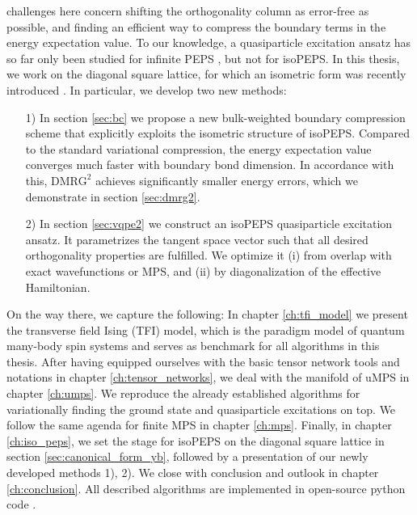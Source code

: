 challenges here concern shifting the orthogonality column as error-free as possible, and finding an efficient way to compress the boundary terms in the energy expectation value. To our knowledge, a quasiparticle excitation ansatz has so far only been studied for infinite PEPS \cite{vanderstraeten2015excitations, vanderstraeten2019simulating}, but not for isoPEPS. In this thesis, we work on the diagonal square lattice, for which an isometric form was recently introduced \cite{sappler2025diagonal}. In particular, we develop two new methods:
\begin{enumerate}
	\item[1)] In section \ref{sec:bc} we propose a new bulk-weighted boundary compression scheme that explicitly exploits the isometric structure of isoPEPS. Compared to the standard variational compression, the energy expectation value converges much faster with boundary bond dimension. In accordance with this, $\text{DMRG}^2$ achieves significantly smaller energy errors, which we demonstrate in section \ref{sec:dmrg2}.
	\item[2)] In section \ref{sec:vqpe2} we construct an isoPEPS quasiparticle excitation ansatz. It parametrizes the tangent space vector such that all desired orthogonality properties are fulfilled. We optimize it (i) from overlap with exact wavefunctions or MPS, and (ii) by diagonalization of the effective Hamiltonian. 
\end{enumerate}
On the way there, we capture the following: In chapter \ref{ch:tfi_model} we present the transverse field Ising (TFI) model, which is the paradigm model of quantum many-body spin systems and serves as benchmark for all algorithms in this thesis. After having equipped ourselves with the basic tensor network tools and notations in chapter \ref{ch:tensor_networks}, we deal with the manifold of uMPS in chapter \ref{ch:umps}. We reproduce the already established algorithms for variationally finding the ground state and quasiparticle excitations on top. We follow the same agenda for finite MPS in chapter \ref{ch:mps}. Finally, in chapter \ref{ch:iso_peps}, we set the stage for isoPEPS on the diagonal square lattice in section \ref{sec:canonical_form_yb}, followed by a presentation of our newly developed methods 1), 2). We close with conclusion and outlook in chapter \ref{ch:conclusion}. All described algorithms are implemented in open-source python code \cite{wittmann2025iso}.